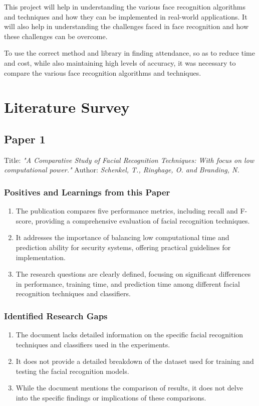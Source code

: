 \documentclass[openany]{report}
\begin{document}
This project will help in understanding the various face recognition algorithms and techniques and how they can be implemented in real-world applications. It will also help in understanding the challenges faced in face recognition and how these challenges can be overcome.

To use the correct method and library in finding attendance, so as to reduce time and cost, while also maintaining high levels of accuracy, it was necessary to compare the various face recognition algorithms and techniques.

\chapter{Literature Survey}

\section{Paper 1}
Title:  \textit{"A Comparative Study of Facial Recognition Techniques: With focus on low computational power."}
Author:  \textit{Schenkel, T., Ringhage, O. and Branding, N.}
\cite{7}
\subsection{Positives and Learnings from this Paper}

\begin{enumerate}
    \item {The publication compares five performance metrics, including recall and F-score, providing a comprehensive evaluation of facial recognition techniques.}
    \item {It addresses the importance of balancing low computational time and prediction ability for security systems, offering practical guidelines for implementation.}
    \item {The research questions are clearly defined, focusing on significant differences in performance, training time, and prediction time among different facial recognition techniques and classifiers.}
\end{enumerate}
\subsection{Identified Research Gaps}

\begin{enumerate}
    \item The document lacks detailed information on the specific facial recognition techniques and classifiers used in the experiments.
    \item It does not provide a detailed breakdown of the dataset used for training and testing the facial recognition models.
    \item While the document mentions the comparison of results, it does not delve into the specific findings or implications of these comparisons.
\end{enumerate}
\end{document}
